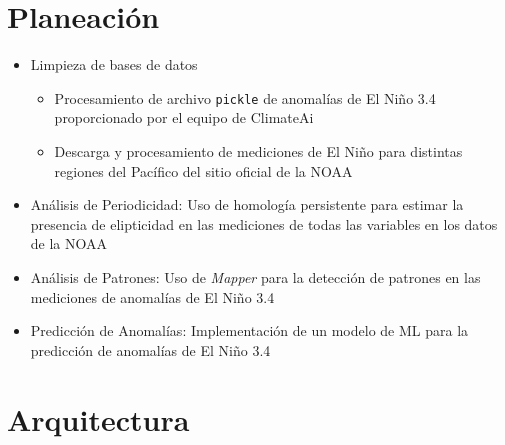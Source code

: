 \documentclass{article}
\begin{document}
    \section{Planeación}

        \begin{itemize}
            \item Limpieza de bases de datos
            \begin{itemize}
                \item Procesamiento de archivo \texttt{pickle} de anomalías de El Niño 3.4 proporcionado por el equipo de ClimateAi
                \item Descarga y procesamiento de mediciones de El Niño para distintas regiones del Pacífico del sitio oficial de la NOAA
            \end{itemize}
            \item Análisis de Periodicidad: Uso de homología persistente para estimar la presencia de elipticidad en las mediciones de todas las variables en los datos de la NOAA
            \item Análisis de Patrones: Uso de \emph{Mapper} para la detección de patrones en las mediciones de anomalías de El Niño 3.4
            \item Predicción de Anomalías: Implementación de un modelo de ML para la predicción de anomalías de El Niño 3.4
        \end{itemize}

    \section{Arquitectura}
\end{document}

